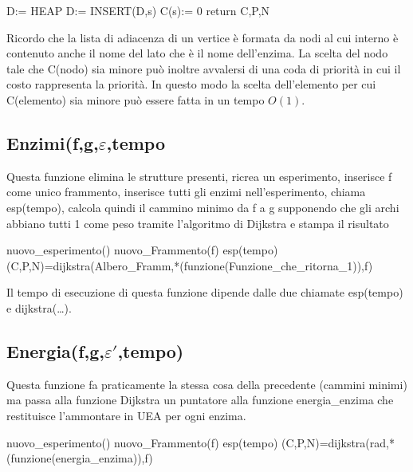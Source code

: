 \documentclass[a4paper,10pt]{article}
\begin{document}
\begin{algorithm}[H]
D:= HEAP\;
D:= INSERT(D,s)\;
C(s):= 0\;
return C,P,N\;
\end{algorithm}
Ricordo che la lista di adiacenza di un vertice è formata da nodi al cui interno è contenuto anche il nome del lato che è il nome dell'enzima. La scelta del nodo tale che C(nodo) sia minore può inoltre avvalersi di una coda di priorità in cui il costo rappresenta la priorità. In questo modo la scelta dell'elemento per cui C(elemento) sia minore può essere fatta in un tempo $O(1)$.
\subsection{Enzimi(f,g,$\varepsilon$,tempo}
Questa funzione elimina le strutture presenti, ricrea un esperimento, inserisce f come unico frammento, inserisce tutti gli enzimi nell'esperimento, chiama esp(tempo), calcola quindi il cammino minimo da f a g supponendo che gli archi abbiano tutti 1 come peso tramite l'algoritmo di Dijkstra e stampa il risultato

\begin{algorithm}[H]
nuovo\_{}esperimento()\;
nuovo\_{}Frammento(f)\;
esp(tempo)\;
(C,P,N)=dijkstra(Albero\_{}Framm,*(funzione(Funzione\_{}che\_{}ritorna\_{}1)),f)\;
\end{algorithm}
Il tempo di esecuzione di questa funzione dipende dalle due chiamate esp(tempo) e dijkstra(\dots{}). 
\subsection{Energia(f,g,$\varepsilon '$,tempo)}
Questa funzione fa praticamente la stessa cosa della precedente (cammini minimi) ma passa alla funzione Dijkstra un puntatore alla funzione energia\_{}enzima che restituisce l'ammontare in UEA per ogni enzima.

\begin{algorithm}[H]
nuovo\_{}esperimento()\;
nuovo\_{}Frammento(f)\;
esp(tempo)\;
(C,P,N)=dijkstra(rad,*(funzione(energia\_{}enzima)),f)\;
\end{algorithm}
\end{document}
